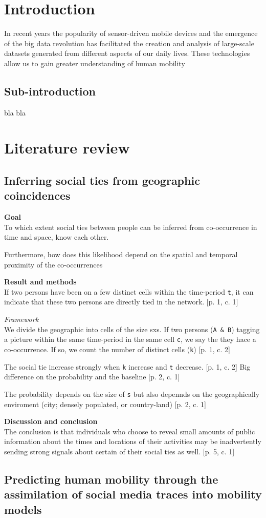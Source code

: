 \section{Introduction}
In recent years the popularity of sensor-driven mobile devices and the emergence of the big data revolution has facilitated the creation and analysis of large-scale datasets generated from different aspects of our daily lives. These technologies allow us to gain greater understanding of human mobility\cite{Uihmp}

\subsection{Sub-introduction}
bla bla


\section{Literature review}
\subsection{Inferring social ties from geographic coincidences \cite{ISTfGC}}
\textbf{Goal}\\
To which extent social ties between people can be inferred from co-occurrence in time and space, know each other. 

Furthermore, how does this likelihood depend on the spatial and temporal proximity of the co-occurrences



\textbf{Result and methods}\\
If two persons have been on a few distinct cells within the time-period \texttt{t}, it can indicate that these two persons are directly tied in the network. [p. 1, c. 1]

\textit{Framework}\\
We divide the geographic into cells of the size sxs. 
If two persons (\texttt{A \& B}) tagging a picture within the same time-period in the same cell \texttt{c}, we say the they hace a co-occurrence. If so, we count the number of distinct cells (\texttt{k}) [p. 1, c. 2]


The social tie increase strongly when \texttt{k} increase and \texttt{t} decrease. [p. 1, c. 2]
Big difference on the probability and the baseline [p. 2, c. 1]

The probability depends on the size of \texttt{s} but also depennds on the geographically enviroment (city; densely populated, or country-land) [p. 2, c. 1]


\textbf{Discussion and conclusion}\\
The conclusion is that individuals who choose to reveal small amounts of public information about the times and locations of their activities may be inadvertently sending strong signals about certain of their social ties as well. [p. 5, c. 1]



\subsection{Predicting human mobility through the assimilation of social media traces into mobility models \cite{human_mob_through_assi}}